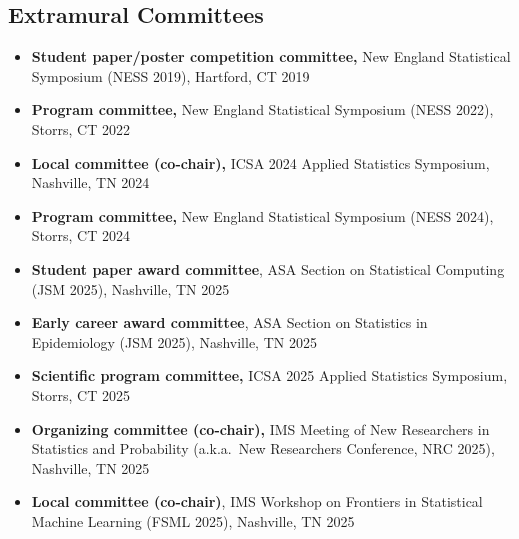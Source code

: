 \documentclass[12pt]{article}
\begin{document}
	\subsection*{Extramural Committees}
	\begin{itemize}
		\item {\bf Student paper/poster competition committee,} New 
		England Statistical Symposium (NESS 2019), Hartford, CT 
		\hfill 2019
		\item {\bf Program committee,} New England Statistical 
		Symposium (NESS 2022), Storrs, CT \hfill 2022
		\item {\bf Local committee (co-chair),} ICSA 2024 Applied 
		Statistics Symposium, Nashville, TN \hfill \mbox{2024}
		\item {\bf Program committee,} New England Statistical 
		Symposium (NESS 2024), Storrs, CT \hfill 2024
		\item {\bf Student paper award committee}, ASA Section 
		on Statistical Computing (JSM 2025), Nashville, TN \hfill 2025
		\item {\bf Early career award committee}, ASA Section on 
		Statistics in Epidemiology (JSM 2025), Nashville, TN \hfill 
		2025
		\item {\bf Scientific program committee,} ICSA 2025 
		Applied Statistics Symposium, Storrs, CT \hfill \mbox{2025}
		\item {\bf Organizing committee (co-chair),} IMS Meeting of 
		New Researchers in Statistics and Probability (a.k.a.\ New 
		Researchers Conference, NRC 2025), Nashville, TN \hfill 2025
		\item {\bf Local committee (co-chair)}, IMS Workshop on 
		Frontiers in Statistical Machine Learning (FSML 2025), 
		Nashville, TN 
		\hfill 2025 
	\end{itemize}
	
\end{document}
